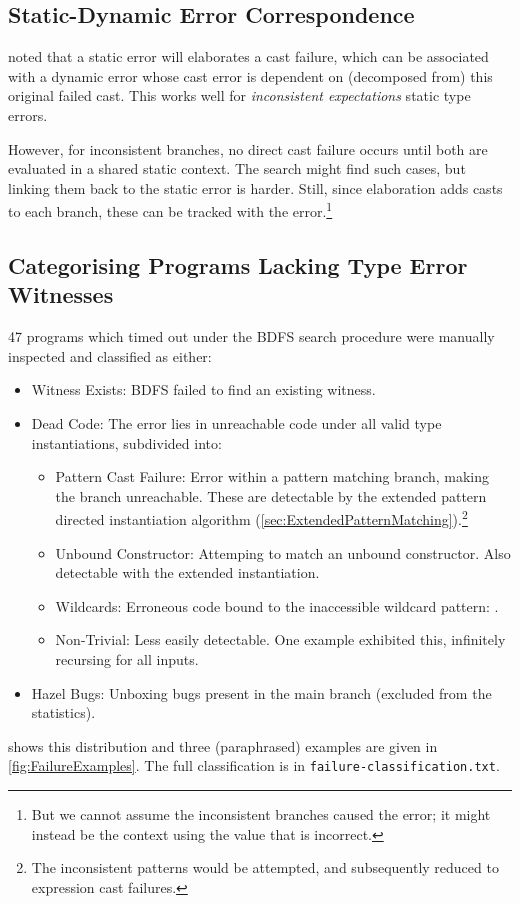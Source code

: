 \subsection{Static-Dynamic Error Correspondence}
\label{sec:ErrorCorrespondence}
 noted that a static error will elaborates a cast failure, which can be associated with a dynamic error whose cast error is dependent on (decomposed from) this original failed cast. This works well for \textit{inconsistent expectations} static type errors.

However, for inconsistent branches, no direct cast failure occurs until both are evaluated in a shared static context. The search might find such cases, but linking them back to the static error is harder. Still, since elaboration adds casts to each branch, these can be tracked with the error.\footnote{But we cannot assume the inconsistent branches caused the error; it might instead be the context using the value that is incorrect.}
  
\subsection{Categorising Programs Lacking Type Error Witnesses}
47 programs which timed out under the BDFS search procedure were manually inspected and classified as either:
\begin{itemize}
\item Witness Exists: BDFS failed to find an existing witness.
\item Dead Code: The error lies in unreachable code under all valid type instantiations, subdivided into:
\begin{itemize}
\item Pattern Cast Failure: Error within a pattern matching branch, making the branch unreachable. These are detectable by the extended pattern directed instantiation algorithm (\cref{sec:ExtendedPatternMatching}).\footnote{The inconsistent patterns would be attempted, and subsequently reduced to expression cast failures.}
\item Unbound Constructor: Attemping to match an unbound constructor. Also detectable with the extended instantiation.
\item Wildcards: Erroneous code bound to the inaccessible wildcard pattern: .
\item Non-Trivial: Less easily detectable. One example exhibited this, infinitely recursing for all inputs.
\end{itemize}
\item Hazel Bugs: Unboxing bugs present in the main branch (excluded from the statistics).
\end{itemize}
 shows this distribution and three (paraphrased) examples are given in \cref{fig:FailureExamples}. The full classification is in \texttt{failure-classification.txt}.

